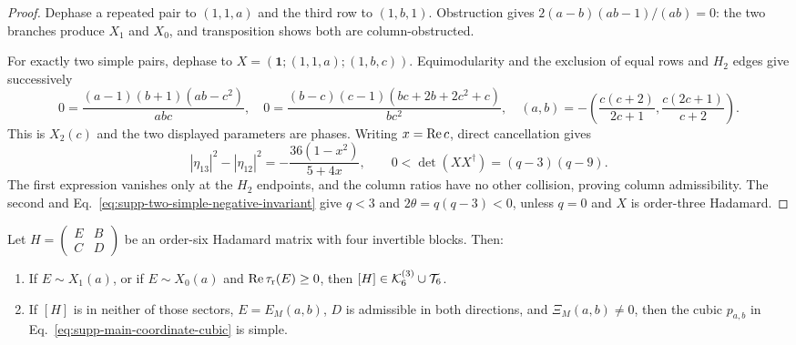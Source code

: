 \begin{proof}
{Dephase a repeated pair to $(1,1,a)$ and the third row to $(1,b,1)$.  Obstruction gives $2(a-b)(ab-1)/(ab)=0$: the two branches produce $X_1$ and $X_0$, and transposition shows both are column-obstructed.}

{For exactly two simple pairs, dephase to $X=(\mathbf1;(1,1,a);(1,b,c))$.  Equimodularity and the exclusion of equal rows and $H_2$ edges give successively}
\begin{equation}
{0=\frac{(a-1)(b+1)(ab-c^2)}{abc},\quad
0=\frac{(b-c)(c-1)(bc+2b+2c^2+c)}{bc^2},\quad
(a,b)=-\left(\frac{c(c+2)}{2c+1},\frac{c(2c+1)}{c+2}\right).}
\end{equation}
{This is $X_2(c)$ and the two displayed parameters are phases.  Writing $x=\operatorname{Re} c$, direct cancellation gives}
\begin{equation}
{|\eta_{13}|^2-|\eta_{12}|^2=-\frac{36(1-x^2)}{5+4x},\qquad
0<\det(XX^\dagger)=(q-3)(q-9).}
\end{equation}
{The first expression vanishes only at the $H_2$ endpoints, and the column ratios have no other collision, proving column admissibility.  The second and Eq.~\eqref{eq:supp-two-simple-negative-invariant} give $q<3$ and $2\theta=q(q-3)<0$, unless $q=0$ and $X$ is order-three Hadamard.}
\end{proof}

\begin{lemma}
\label{lem:supp-degenerate-diagonal-closure}
{Let $H=\left(\begin{smallmatrix}E&B\\C&D\end{smallmatrix}\right)$ be an order-six Hadamard matrix with four invertible blocks. Then:}
\begin{enumerate}
\item {If $E\sim X_1(a)$, or if $E\sim X_0(a)$ and $\operatorname{Re}\tau_{\rm r}(E)\ge0$, then $[H]\in\mathcal K_6^{(3)}\cup\mathcal T_6$.}
\item {If $[H]$ is in neither of those sectors, $E=E_M(a,b)$, $D$ is admissible in both directions, and $\Xi_M(a,b)\ne0$, then the cubic $p_{a,b}$ in Eq.~\eqref{eq:supp-main-coordinate-cubic} is simple.}
\end{enumerate}
\end{lemma}

